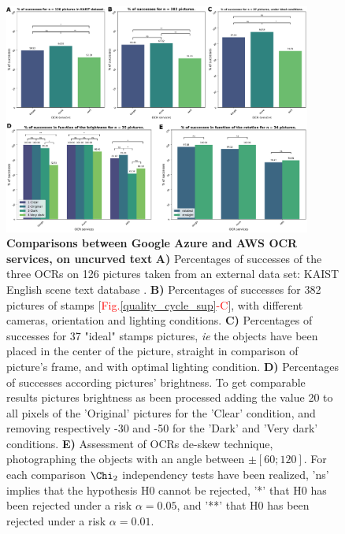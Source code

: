 \documentclass[12pt, french, a4paper]{article} %
\begin{document}
\begin{figure}[H]
 \centering
 \includegraphics[width=0.9\textwidth]{figure/main_ocr.pdf}
 \caption{\textbf{Comparisons between Google Azure and AWS \gls{OCR} services, on uncurved text} \textbf{A)} Percentages of successes of the three OCRs on 126 pictures taken from an external data set: KAIST English scene text database \cite{KAIST}. \textbf{B)}
 Percentages of successes for 382 pictures of stamps [\textcolor{red}{Fig.}\ref{quality_cycle_sup}\textcolor{red}{-C}], with different cameras, orientation and lighting conditions. \textbf{C)} Percentages of successes for 37 "ideal" stamps pictures, \textit{ie} the objects have been placed in the center of the picture, straight in comparison of picture's frame, and with optimal lighting condition. \textbf{D)} Percentages of successes according pictures' brightness. To get comparable results pictures brightness as been processed adding the value 20 to all pixels of the 'Original' pictures for the 'Clear' condition, and removing respectively -30 and -50 for the 'Dark' and 'Very dark' conditions. \textbf{E)} Assessment of OCRs de-skew technique, photographing the objects with an angle between $\pm[60;120]$. For each comparison $\Chi_2$ independency tests have been realized, 'ns' implies that the hypothesis H0 cannot be rejected, '*' that H0 has been rejected under a risk $\alpha =0.05$, and '**' that H0 has been rejected under a risk $\alpha =0.01$.}
 \label{OCR_main}
\end{figure}
\end{document}
